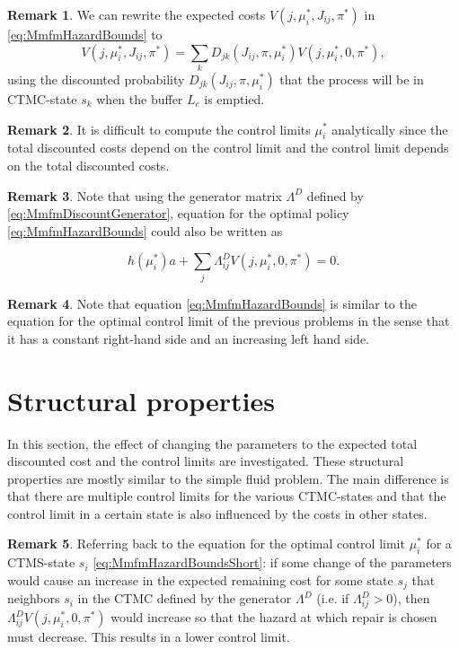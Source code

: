 \documentclass[a4paper]{thesis}
\theoremstyle{definition}
\newtheorem{remark}{Remark}[chapter]
\begin{document}
\begin{remark}
	We can rewrite the expected costs $V(j,\mu_i^*,J_{ij},\pi^*)$ in \eqref{eq:MmfmHazardBounds} to
	\[
	V(j,\mu_i^*,J_{ij},\pi^*)=\sum\limits_k D_{jk}(J_{ij},\pi,\mu_i^*)V(j,\mu_i^*,0,\pi^*),
	\]
	using the discounted probability $D_{jk}(J_{ij},\pi,\mu_i^*)$ that the process will be in CTMC-state $s_k$ when the buffer $L_c$ is emptied.
\end{remark}

\begin{remark}
	It is difficult to compute the control limits $\mu_i^*$ analytically since the total discounted costs depend on the control limit and the control limit depends on the total discounted costs.
\end{remark}

\begin{remark}
Note that using the generator matrix $\Lambda^D$ defined by \eqref{eq:MmfmDiscountGenerator}, equation for the optimal policy \eqref{eq:MmfmHazardBounds} could also be written as

\begin{equation}\label{eq:MmfmHazardBoundsShort}
h(\mu_i^*)a+\sum\limits_j\Lambda^D_{ij}V(j,\mu_i^*,0,\pi^*)=0.
\end{equation}
\end{remark}

\begin{remark}
Note that equation \eqref{eq:MmfmHazardBounds} is similar to the equation for the optimal control limit of the previous problems in the sense that it has a constant right-hand side and an increasing left hand side.
\end{remark} \section{Structural properties}\label{section:MmfmStructuralProperties}
In this section, the effect of changing the parameters to the expected total discounted cost and the control limits are investigated.
These structural properties are mostly similar to the simple fluid problem.
The main difference is that there are multiple control limits for the various CTMC-states and that the control limit in a certain state is also influenced by the costs in other states.

\begin{remark}
	Referring back to the equation for the optimal control limit $\mu_i^*$ for a CTMS-state $s_i$ \eqref{eq:MmfmHazardBoundsShort}: if some change of the parameters would cause an increase in the expected remaining cost for some state $s_j$ that neighbors $s_i$ in the CTMC defined by the generator $\Lambda^D$ (i.e. if $\Lambda^D_{ij}>0$), then $\Lambda^D_{ij}V(j,\mu_i^*,0,\pi^*)$ would increase so that the hazard at which repair is chosen must decrease.
	This results in a lower control limit.
\end{remark}
\end{document}

